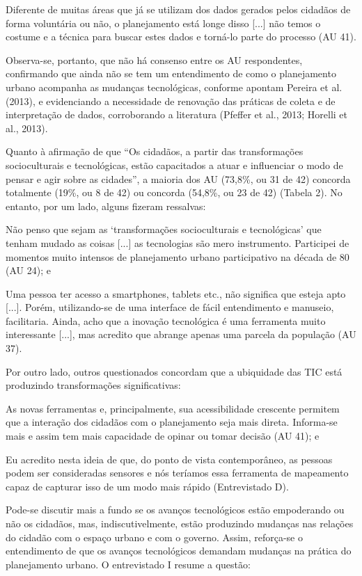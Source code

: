 \documentclass{article}
\begin{document}
\begin{multicols}{2}
Diferente de muitas áreas que já se utilizam dos dados gerados pelos cidadãos
de forma voluntária ou não, o planejamento está longe disso
[...] não temos o costume e a técnica para buscar estes
dados e torná-lo parte do processo (AU 41).

Observa-se, portanto, que não há consenso entre os AU respondentes, confirmando
que ainda não se tem um entendimento de como o planejamento urbano acompanha as
mudanças tecnológicas, conforme apontam Pereira
et al. (2013), e evidenciando a necessidade de renovação das práticas
de coleta e de interpretação de dados, corroborando a literatura (Pfeffer et
al., 2013; Horelli et al., 2013).

Quanto à afirmação de que “Os cidadãos, a partir das transformações
socioculturais e tecnológicas, estão capacitados a atuar e influenciar o
modo de pensar e agir sobre as cidades”, a maioria dos AU (73,8\%,
ou 31 de 42) concorda totalmente (19\%, ou 8 de 42) ou concorda (54,8\%, ou 23
de
42) (Tabela 2). No entanto, por um lado,
alguns fizeram ressalvas:

Não penso que sejam as ‘transformações socioculturais e tecnológicas’ que
tenham mudado as coisas [...] as tecnologias são mero instrumento.
Participei de momentos muito intensos de planejamento urbano participativo
na década de 80 (AU 24); e

Uma pessoa ter acesso a smartphones, tablets etc., não significa que esteja
apto [...]. Porém, utilizando-se de uma interface de fácil
entendimento e manuseio, facilitaria. Ainda, acho que a inovação tecnológica
é uma ferramenta muito interessante [...], mas acredito que
abrange apenas uma parcela da população (AU 37).

Por outro lado, outros questionados concordam que a ubiquidade das TIC está
produzindo transformações significativas:

As novas ferramentas e, principalmente, sua acessibilidade crescente permitem
que a interação dos cidadãos com o planejamento seja mais direta. Informa-se
mais e assim tem mais capacidade de opinar ou tomar decisão (AU 41);
e

Eu acredito nesta ideia de que, do ponto de vista contemporâneo, as pessoas
podem ser consideradas sensores e nós teríamos essa ferramenta de mapeamento
capaz de capturar isso de um modo mais rápido (Entrevistado
D).

Pode-se discutir mais a fundo se os avanços tecnológicos estão empoderando ou
não
os cidadãos, mas, indiscutivelmente, estão produzindo mudanças nas relações do
cidadão com o espaço urbano e com o governo. Assim, reforça-se o entendimento de
que os avanços tecnológicos demandam mudanças na prática do planejamento urbano.
O entrevistado I resume a questão:


\end{multicols}
\end{document}
